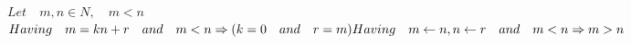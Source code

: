 \documentclass{article}
\begin{document}
$Let \quad m, n \in  N, \quad m < n$\\
$
Having \quad m = kn + r \quad and \quad m < n\\
\Rightarrow (k = 0 \quad and \quad r =  m)\\
Having \quad m \leftarrow n, n \leftarrow r \quad and \quad m < n\\
\Rightarrow m > n\\
$
\end{document}
